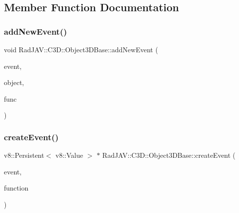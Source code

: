 \subsection{Member Function Documentation}
\mbox{\label{class_rad_j_a_v_1_1_c3_d_1_1_object3_d_base_a80619ac6848a546614c9fc45c4f614d0}} 
\subsubsection{\texorpdfstring{add\+New\+Event()}{addNewEvent()}}
{\footnotesize\ttfamily void Rad\+J\+A\+V\+::\+C3\+D\+::\+Object3\+D\+Base\+::add\+New\+Event (\begin{DoxyParamCaption}\item[{\mbox{\hyperlink{class_rad_j_a_v_1_1_string}{String}}}]{event,  }\item[{Ogre\+::\+Movable\+Object $\ast$}]{object,  }\item[{v8\+::\+Local$<$ v8\+::\+Function $>$}]{func }\end{DoxyParamCaption})}

\mbox{\label{class_rad_j_a_v_1_1_c3_d_1_1_object3_d_base_ae65c019baa89111fa96e4322487c609b}} 
\subsubsection{\texorpdfstring{create\+Event()}{createEvent()}}
{\footnotesize\ttfamily v8\+::\+Persistent$<$ v8\+::\+Value $>$ $\ast$ Rad\+J\+A\+V\+::\+C3\+D\+::\+Object3\+D\+Base\+::create\+Event (\begin{DoxyParamCaption}\item[{\mbox{\hyperlink{class_rad_j_a_v_1_1_string}{String}}}]{event,  }\item[{v8\+::\+Local$<$ v8\+::\+Function $>$}]{function }\end{DoxyParamCaption})}

